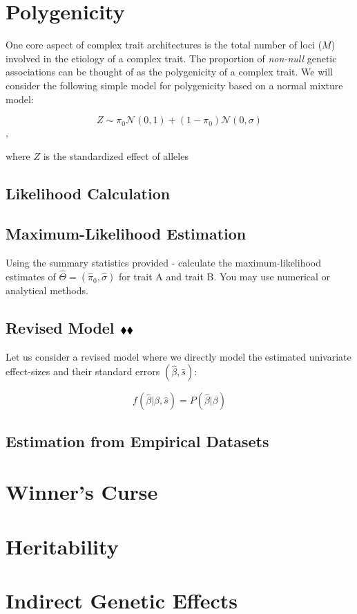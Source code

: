 \documentclass{pset}
\date{6/1/2025}
\begin{document}
\maketitle

\section{Polygenicity}

One core aspect of complex trait architectures is the total number of loci ($M$) involved in the etiology of a complex trait. The proportion of \textit{non-null} genetic associations can be thought of as the polygenicity of a complex trait. We will consider the following simple model for polygenicity based on a normal mixture model:  

$$Z \sim \pi_0 \mathcal{N}(0,1) + (1 - \pi_0)\mathcal{N}(0,\sigma)$$,

where $Z$ is the standardized effect of alleles

\subsection*{Likelihood Calculation}


\subsection*{Maximum-Likelihood Estimation}

Using the summary statistics provided - calculate the maximum-likelihood estimates of $\hat{\Theta} = (\hat{\pi}_0, \hat{\sigma})$ for trait A and trait B. You may use numerical or analytical methods. 

\subsection*{Revised Model $\mathbin{\blacklozenge}\mathbin{\blacklozenge}$}

Let us consider a revised model where we directly model the estimated univariate effect-sizes and their standard errors $(\hat{\beta}, \hat{s})$:

$$f(\hat{\beta} | \beta, \hat{s}) = P(\hat{\beta} | \beta)$$



\subsection*{Estimation from Empirical Datasets}


\section{Winner's Curse}



\section{Heritability}




\section{Indirect Genetic Effects}
\end{document}
